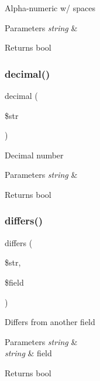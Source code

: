 Alpha-\/numeric w/ spaces


\begin{DoxyParams}{Parameters}
{\em string} & \\
\hline
\end{DoxyParams}
\begin{DoxyReturn}{Returns}
bool 
\end{DoxyReturn}
\mbox{\label{class_c_i___form__validation_af460b7c2f8d785b7472329446c600f31}} 
\subsubsection{\texorpdfstring{decimal()}{decimal()}}
{\footnotesize\ttfamily decimal (\begin{DoxyParamCaption}\item[{}]{\$str }\end{DoxyParamCaption})}

Decimal number


\begin{DoxyParams}{Parameters}
{\em string} & \\
\hline
\end{DoxyParams}
\begin{DoxyReturn}{Returns}
bool 
\end{DoxyReturn}
\mbox{\label{class_c_i___form__validation_aff14b601a3e51ef2323a4c241d81267e}} 
\subsubsection{\texorpdfstring{differs()}{differs()}}
{\footnotesize\ttfamily differs (\begin{DoxyParamCaption}\item[{}]{\$str,  }\item[{}]{\$field }\end{DoxyParamCaption})}

Differs from another field


\begin{DoxyParams}{Parameters}
{\em string} & \\
\hline
{\em string} & field \\
\hline
\end{DoxyParams}
\begin{DoxyReturn}{Returns}
bool 
\end{DoxyReturn}
\mbox{\label{class_c_i___form__validation_ae8fff4cb083a2a66c900f8bd61216bdd}} 
